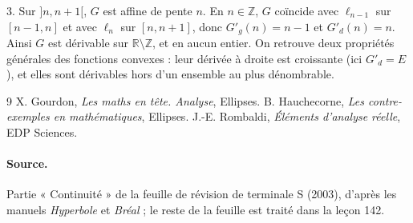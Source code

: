 \documentclass[11pt,a4paper]{article}
\theoremstyle{plain}
\theoremstyle{definition}
\theoremstyle{remark}
\newcommand{\Z}{\mathbb{Z}}
\newcommand{\R}{\mathbb{R}}
\newcommand{\1}{\mathbf{1}}
\begin{document}
3. Sur $]n,n+1[$, $G$ est affine de pente $n$. En $n\in\Z$, $G$ coïncide avec $\ell_{n-1}$ sur $[n-1,n]$ et avec $\ell_n$ sur $[n,n+1]$, donc $G'_g(n)=n-1$ et $G'_d(n)=n$. Ainsi $G$ est dérivable sur $\R\setminus\Z$, et en aucun entier. On retrouve deux propriétés générales des fonctions convexes : leur dérivée à droite est croissante (ici $G'_d=E$), et elles sont dérivables hors d'un ensemble au plus dénombrable.

\begin{thebibliography}{9}
 X. Gourdon, \emph{Les maths en tête. Analyse}, Ellipses.
 B. Hauchecorne, \emph{Les contre-exemples en mathématiques}, Ellipses.
 J.-E. Rombaldi, \emph{Éléments d'analyse réelle}, EDP Sciences.
\end{thebibliography}

\paragraph{Source.} Partie « Continuité » de la feuille de révision de terminale S (2003), d'après les manuels \emph{Hyperbole} et \emph{Bréal} ; le reste de la feuille est traité dans la leçon 142.
\end{document}
